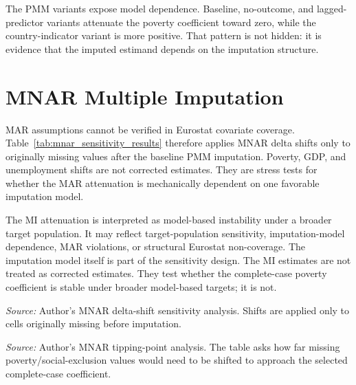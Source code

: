 The PMM variants expose model dependence. Baseline, no-outcome, and lagged-predictor variants attenuate the poverty coefficient toward zero, while the country-indicator variant is more positive. That pattern is not hidden: it is evidence that the imputed estimand depends on the imputation structure.

\section{MNAR Multiple Imputation}

MAR assumptions cannot be verified in Eurostat covariate coverage. Table~\ref{tab:mnar_sensitivity_results} therefore applies MNAR delta shifts only to originally missing values after the baseline PMM imputation. Poverty, GDP, and unemployment shifts are not corrected estimates. They are stress tests for whether the MAR attenuation is mechanically dependent on one favorable imputation model.

The MI attenuation is interpreted as model-based instability under a broader target population. It may reflect target-population sensitivity, imputation-model dependence, MAR violations, or structural Eurostat non-coverage. The imputation model itself is part of the sensitivity design. The MI estimates are not treated as corrected estimates. They test whether the complete-case poverty coefficient is stable under broader model-based targets; it is not.

\begin{table}[H]
\centering
\scriptsize
\caption{MNAR delta-shift sensitivity for the poverty coefficient. Scenarios shift only originally missing values after PMM imputation and are stress tests for MAR departures, not corrected estimates.}
\label{tab:mnar_sensitivity_results}

\vspace{0.25em}

\begin{minipage}{0.96\textwidth}
\scriptsize \textit{Source:} Author's MNAR delta-shift sensitivity analysis. Shifts are applied only to cells originally missing before imputation.
\end{minipage}
\end{table}

\begin{table}[H]
\centering
\small
\caption{MNAR tipping-point grid for the poverty/social-exclusion coefficient. Shifts are applied only to originally missing poverty/social-exclusion values after PMM imputation and are compared with the selected complete-case FE coefficient.}
\label{tab:mnar_tipping_point_results}

\vspace{0.25em}

\begin{minipage}{0.92\textwidth}
\scriptsize \textit{Source:} Author's MNAR tipping-point analysis. The table asks how far missing poverty/social-exclusion values would need to be shifted to approach the selected complete-case coefficient.
\end{minipage}
\end{table}

